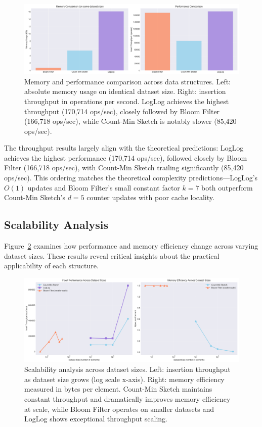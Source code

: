 \begin{figure}[h]
\centering
\includegraphics[width=\textwidth]{../figures/benchmarks/memory_performance_comparison.png}
\caption{Memory and performance comparison across data structures. Left: absolute memory usage on identical dataset size. Right: insertion throughput in operations per second. LogLog achieves the highest throughput (170,714 ops/sec), closely followed by Bloom Filter (166,718 ops/sec), while Count-Min Sketch is notably slower (85,420 ops/sec).}
\label{fig:memory_performance}
\end{figure}

The throughput results largely align with the theoretical predictions: LogLog achieves the highest performance (170,714 ops/sec), followed closely by Bloom Filter (166,718 ops/sec), with Count-Min Sketch trailing significantly (85,420 ops/sec). This ordering matches the theoretical complexity predictions---LogLog's $O(1)$ updates and Bloom Filter's small constant factor $k=7$ both outperform Count-Min Sketch's $d=5$ counter updates with poor cache locality.

\subsection{Scalability Analysis}

Figure~\ref{fig:scalability} examines how performance and memory efficiency change across varying dataset sizes. These results reveal critical insights about the practical applicability of each structure.

\begin{figure}[h]
\centering
\includegraphics[width=\textwidth]{../figures/benchmarks/scalability_analysis.png}
\caption{Scalability analysis across dataset sizes. Left: insertion throughput as dataset size grows (log scale x-axis). Right: memory efficiency measured in bytes per element. Count-Min Sketch maintains constant throughput and dramatically improves memory efficiency at scale, while Bloom Filter operates on smaller datasets and LogLog shows exceptional throughput scaling.}
\label{fig:scalability}
\end{figure}

